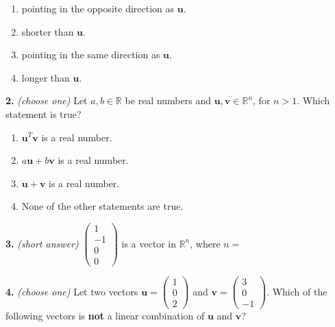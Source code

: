 \documentclass[10pt,a4paper]{article}
\begin{document}
\begin{enumerate}[label=(\Alph*)]
\item pointing in the opposite direction as \(\mathbf{u}\).
\item shorter than \(\mathbf{u}\).
\item pointing in the same direction as \(\mathbf{u}\).
\item longer than \(\mathbf{u}\).
\end{enumerate}
\smallskip
\textbf{2.} \textit{(choose one)} Let \(a,b\in\mathbb{R}\) be real numbers and \(\mathbf{u,v}\in\mathbb{R}^n\), for \(n>1\). Which statement is true?

\begin{enumerate}[label=(\Alph*)]
\item \(\mathbf{u}^T\mathbf{v}\) is a real number.
\item \(a\mathbf{u}+b\mathbf{v}\) is a real number.
\item \(\mathbf{u+v}\) is a real number.
\item None of the other statements are true.
\end{enumerate}
\smallskip
\textbf{3.} \textit{(short answer)} \(\begin{pmatrix}1\\-1\\0\\0\end{pmatrix}\) is a vector in \(\mathbb{R}^n\), where \(n=\)

\smallskip
\textbf{4.} \textit{(choose one)} Let two vectors \(\mathbf{u}=\begin{pmatrix}1\\0\\2\end{pmatrix}\) and \(\mathbf{v}=\begin{pmatrix}3\\0\\-1\end{pmatrix}\). Which of the following vectors is \textbf{not }a linear combination of \(\mathbf{u}\) and \(\mathbf{v}\)?
\end{document}
